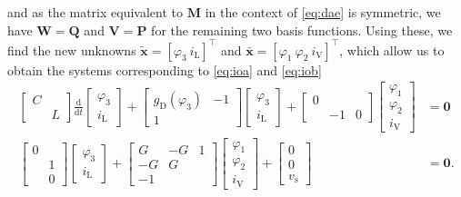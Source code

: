 \documentclass[AMA,STIX1COL]{WileyNJD-v2}
\newcommand{\mb}[1]{\mathbf{#1}}
\newcommand{\mbt}[1]{\tilde{\mathbf{#1}}}
\newcommand{\mbb}[1]{\bar{\mathbf{#1}}}
\newcommand{\mr}[1]{\mathrm{#1}}
\newcommand{\T}{{\!\top}}
\newcommand{\ddt}{\frac{\mathrm{d}}{\mathrm{d}t}}
\begin{document}
and as the matrix equivalent to $\mb{M}$ in the context of \eqref{eq:dae} is symmetric, we have $\mb{W} = \mb{Q}$ and $\mb{V} = \mb{P}$ for the remaining two basis functions. Using these, we find the new unknowns $\mbt{x} = [\varphi_3\ i_\mr{L}]^{\T}$ and $\mbb{x} = [\varphi_1\ \varphi_2\ i_\mr{V}]^{\T}$, which allow us to obtain the systems corresponding to \eqref{eq:ioa} and \eqref{eq:iob}
\begin{subequations}
    \label{eq:ei}
    \begin{align}
        \begin{bmatrix}
            C &\\
            & L
        \end{bmatrix} \ddt \begin{bmatrix}
            \varphi_3\\
            i_\mr{L}
        \end{bmatrix} + \begin{bmatrix}
            g_\mr{D}(\varphi_3) & -1\\
            1 &
        \end{bmatrix} \begin{bmatrix}
            \varphi_3\\
            i_\mr{L}
        \end{bmatrix} + \begin{bmatrix}
            0 & &\\
            & -1 & 0
        \end{bmatrix} \begin{bmatrix}
            \varphi_1\\
            \varphi_2\\
            i_\mr{V}
        \end{bmatrix} &= \mb{0} \label{eq:eia}\\
        \begin{bmatrix}
            0 &\\
            & 1\\
            & 0
        \end{bmatrix} \begin{bmatrix}
            \varphi_3\\
            i_\mr{L}
        \end{bmatrix} + \begin{bmatrix}
            G & -G & 1\\
            -G & G &\\
            -1 & &
        \end{bmatrix} \begin{bmatrix}
            \varphi_1\\
            \varphi_2\\
            i_\mr{V}
        \end{bmatrix} + \begin{bmatrix}
            0\\
            0\\
            v_\mr{s}
        \end{bmatrix} &= \mb{0} \label{eq:eib}.
    \end{align}
\end{subequations}
\end{document}
